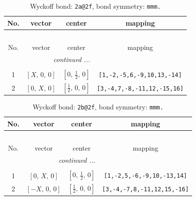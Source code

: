 \documentclass[fleqn,8pt]{jsarticle}
\begin{document}
\begin{longtable}{cccc}
\caption{Wyckoff bond: {\tt 2a@2f}, bond symmetry: {\tt mmm.}}
 \\
 \hline \hline
No. & vector & center & mapping \\ \hline \endfirsthead

\multicolumn{3}{l}{\tablename\ \thetable{}} \\
 \hline \hline
No. & vector & center & mapping \\ \hline \endhead

 \hline \hline
\multicolumn{3}{r}{\footnotesize\it continued ...} \\ \endfoot

 \hline \hline
\multicolumn{3}{r}{} \\ \endlastfoot

1 & $\left[ X,\, 0,\, 0 \right]$ & $\left[ 0,\, \frac{1}{2},\, 0 \right]$ & {\tt [1,-2,-5,6,-9,10,13,-14]} \\ \hline
2 & $\left[ 0,\, X,\, 0 \right]$ & $\left[ \frac{1}{2},\, 0,\, 0 \right]$ & {\tt [3,-4,7,-8,-11,12,-15,16]} \\
\end{longtable}
\renewcommand{\arraystretch}{1.2}
\begin{longtable}{cccc}
\caption{Wyckoff bond: {\tt 2b@2f}, bond symmetry: {\tt mmm.}}
 \\
 \hline \hline
No. & vector & center & mapping \\ \hline \endfirsthead

\multicolumn{3}{l}{\tablename\ \thetable{}} \\
 \hline \hline
No. & vector & center & mapping \\ \hline \endhead

 \hline \hline
\multicolumn{3}{r}{\footnotesize\it continued ...} \\ \endfoot

 \hline \hline
\multicolumn{3}{r}{} \\ \endlastfoot

1 & $\left[ 0,\, X,\, 0 \right]$ & $\left[ 0,\, \frac{1}{2},\, 0 \right]$ & {\tt [1,-2,5,-6,-9,10,-13,14]} \\ \hline
2 & $\left[ - X,\, 0,\, 0 \right]$ & $\left[ \frac{1}{2},\, 0,\, 0 \right]$ & {\tt [3,-4,-7,8,-11,12,15,-16]} \\
\end{longtable}
\renewcommand{\arraystretch}{1.2}
\end{document}
